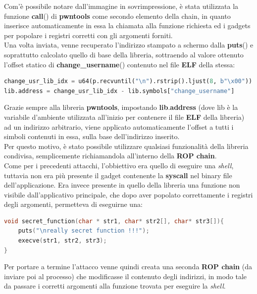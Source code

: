 Com'è possibile notare dall'immagine in sovrimpressione, è stata utilizzata la funzione \textbf{call}() di \textbf{pwntools} come secondo elemento della chain, in quanto inserisce automaticamente in essa la chiamata alla funzione richiesta ed i gadgets per popolare i registri corretti con gli argomenti forniti.\\
Una volta inviata, venne recuperato l'indirizzo stampato a schermo dalla \textbf{puts}() e soprattutto calcolato quello di base della libreria, sottraendo al valore ottenuto l'offset statico di \textbf{change\_username}() contenuto nel file \textbf{ELF} della stessa:
\begin{lstlisting}[language=Python, label=cu-idx, caption={Ricezione dell'indirizzo effettivo di \textbf{change\_username}() e calcolo-impostazione dell'indirizzo di base in memoria della libreria.}, style =Python]
change_usr_lib_idx = u64(p.recvuntil("\n").rstrip().ljust(8, b"\x00"))
lib.address = change_usr_lib_idx - lib.symbols["change_username"]           
\end{lstlisting}
Grazie sempre alla libreria \textbf{pwntools}, impostando \textbf{lib}.\textbf{address} (dove lib è la variabile d'ambiente utilizzata all'inizio per contenere il file \textbf{ELF} della libreria) ad un indirizzo arbitrario, viene applicato automaticamente l'offset a tutti i simboli
contenuti in essa, sulla base dell'indirizzo inserito.\\
Per questo motivo, è stato possibile utilizzare qualsiasi funzionalità della libreria condivisa, semplicemente richiamandola all'interno della \textbf{ROP chain}.\\
Come per i precedenti attacchi, l'obbiettivo era quello di eseguire una \textit{shell}, tuttavia non era più presente il gadget contenente la \textbf{syscall} nel binary file dell'applicazione. Era invece presente in quello della libreria una funzione non visibile dall'applicativo 
principale, che dopo aver popolato correttamente i registri degli argomenti, permetteva di eseguirne una:
\begin{lstlisting}[language=C, label=secret function, caption={Funzione \textbf{secret\_function}() della libreria condivisa.}, style=C lang]
void secret_function(char * str1, char* str2[], char* str3[]){
    puts("\nreally secret function !!!");
    execve(str1, str2, str3);
}
\end{lstlisting}
Per portare a termine l'attacco venne quindi creata una seconda \textbf{ROP chain} (da inviare poi al processo) che modificasse il contenuto degli indirizzi, in modo tale da passare i corretti argomenti alla funzione trovata per eseguire la \textit{shell}.
